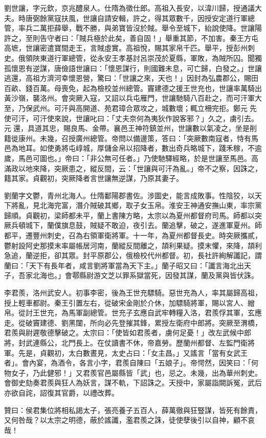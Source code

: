 \begin{pinyinscope}
 劉世讓，字元欽，京兆醴泉人。仕隋為徵仕郎。高祖入長安，以湋川歸，授通議大夫。時唐弼餘黨寇扶風，世讓自請安輯，許之，得其眾數千，因授安定道行軍總管，率兵二萬拒薛舉，戰不勝，與弟寶皆沒於賊。舉令至城下，紿說使降。世讓陽許之，至則告守者曰：「賊兵極於此矣，善自固！」舉重其節，不加害。秦王方屯高墌，世讓密遣寶間走王，言賊虛實。高祖悅，賜其家帛千匹。舉平，授彭州刺史。俄領陜東道行軍總管，從永安王孝基討呂崇茂於夏縣，軍敗，為賊所囚。聞獨孤懷恩有逆謀，唐儉語世讓曰：「懷恩謀行，則國難未息，可亡歸，白發之。」世讓逃還，高祖方濟河幸懷恩營，驚曰：「世讓之來，天也！」因封為弘農郡公，賜田百畝、錢百萬。母喪免，起為檢校並州總管。竇建德之援王世充也，世讓率萬騎出黃沙嶺，襲洛州。會突厥入寇，又詔以兵屯雁門，世讓馳騎八百赴之，而可汗軍大至，乃保武州。可汗與高開道、苑君璋合眾攻之，城數壞；輒立柵完拒。鄭元先使可汗，可汗使來說，世讓叱曰：「丈夫奈何為夷狄作說客邪？」久之，虜引去。元還，具道其忠，賜良馬、金帶。襄邑王神符鎮並州，世讓數以氣凌之，坐是削籍徙康州。未幾，召授廣州總管。帝問以備邊策，答曰：「突厥數南寇者，恃有馬邑為地耳。如使勇將屯崞城，厚儲金帛以招降者，數出奇兵略城下，踐禾稼，不逾歲，馬邑可圖也。」帝曰：「非公無可任者。」乃使馳驛經略，於是世讓至馬邑。高滿政以地來降，突厥患之，縱反間，云：「世讓與可汗為亂。」帝不之察，因誅之，籍其家。貞觀初，突厥降者言世讓無逆謀，乃原其妻子。



 劉蘭字文鬱，青州北海人。仕隋鄱陽郡書佐。涉圖史，能言成敗事。性陰狡，以天下將亂，見北海完富，潛介賊破其鄉，取子女玉帛。淮安王神通安撫山東，率宗黨歸順。貞觀初，梁師都未平，蘭上書陳方略，太宗以為夏州都督府司馬。師都以突厥兵頓城下，蘭僕旗息鼓，賊疑不敢迫，夜引去。蘭追擊，破之，遂進軍夏州。師都平，遷豐州刺史，召為右領軍衛將軍。十一年，為夏州都督長史。時突厥攜貳，鬱射設阿史那摸末率屬帳居河南，蘭縱反間離之，頡利果疑。摸末懼，來降，頡利急追，蘭逆拒，卻其眾。封平原郡公，俄檢校代州都督。初，長社許絢解讖記，謂蘭曰：「天下有長年者，咸言劉將軍當為天下主。」蘭子昭又曰：「讖言海北出天子，吾家北海也。」會鄠縣尉游文芝以罪系獄當死，因發其謀，蘭及黨與皆伏誅。



 李君羨，洛州武安人。初事李密，後為王世充驃騎。惡世充為人，率其屬歸高祖，授上輕車都尉。秦王引置左右，從破宋金剛於介休，加驃騎將軍，賜以宮人、繒帛。從討王世充，為馬軍副總管。世充子玄應自武牢轉糧入洛，君羨俘其軍，玄應走。從破竇建德、劉黑闥，所向必先登摧其鋒，累授左衛府中郎將。突厥至渭橋，君羨與尉遲敬德擊破之。太宗曰：「使皆如君羨者，虜何足憂！」改左武候中郎將，封武連縣公，北門長上。在仗讀書不休，帝嘉勞。歷蘭州都督、左監門衛將軍。先是，貞觀初，太白數晝見，太史占曰：「女主昌。」又謠言「當有女武王者」。會內宴，為酒令，各言小字，君羨自陳曰「五娘子」。帝愕然，因笑曰：「何物女子，乃此健邪！」又君羨官邑屬縣皆「武」也，忌之。未幾，出為華州刺史。會御史劾奏君羨與狂人為妖言，謀不軌，下詔誅之。天授中，家屬詣闕訴冤，武后亦欲自詫，詔復其官爵，以禮改葬。



 贊曰：侯君集位將相私謁太子，張亮養子五百人，薛萬徹與狂豎謀，皆死有餘責，又何咎哉？以太宗之明德，蔽於謠讖，濫君羨之誅，徒使孽後引以自神，顧不哀哉！



\end{pinyinscope}